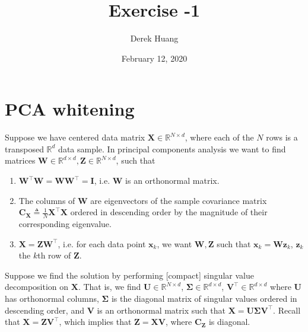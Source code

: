 \documentclass{article}
\title{Exercise -1}
\author{Derek Huang}
\date{February 12, 2020}
\numberwithin{equation}{section}
\begin{document}
\maketitle
\thispagestyle{fancy}

\section{PCA whitening}

Suppose we have centered data matrix $ \mathbf{X} \in
\mathbb{R}^{N \times d} $, where each of the $ N $ rows is a transposed
$ \mathbb{R}^d $ data sample. In principal components analysis we want to find
matrices $ \mathbf{W} \in \mathbb{R}^{d \times d},
\mathbf{Z} \in \mathbb{R}^{N \times d} $, such that
\begin{enumerate}
    \item
    $ \mathbf{W}^\top\mathbf{W} = \mathbf{WW}^\top = \mathbf{I} $, i.e.
    $ \mathbf{W} $ is an orthonormal matrix.

    \item
    The columns of $ \mathbf{W} $ are eigenvectors of the sample covariance
    matrix $ \mathbf{C}_\mathbf{X} \triangleq \frac{1}{N}\mathbf{X}^\top\mathbf{X} $
    ordered in descending order by the magnitude of their corresponding
    eigenvalue.

    \item
    $ \mathbf{X} = \mathbf{ZW}^\top $, i.e. for each data point
    $ \mathbf{x}_k $, we want $ \mathbf{W}, \mathbf{Z} $ such that
    $ \mathbf{x}_k = \mathbf{Wz}_k $, $ \mathbf{z}_k $ the $ k $th row of
    $ \mathbf{Z} $.
\end{enumerate}

Suppose we find the solution by performing [compact] singular value
decomposition on $ \mathbf{X} $. That is, we find $ \mathbf{U} \in
\mathbb{R}^{N \times d} $, $ \mathbf{\Sigma} \in \mathbb{R}^{d \times d} $,
$ \mathbf{V}^\top \in \mathbb{R}^{d \times d} $ where $ \mathbf{U} $ has
orthonormal columns, $ \mathbf{\Sigma} $ is the diagonal matrix of singular
values\footnotemark{} ordered in descending order, and $ \mathbf{V} $ is an orthonormal matrix
such that $ \mathbf{X} = \mathbf{U\Sigma V}^\top $. Recall that
$ \mathbf{X} = \mathbf{ZV}^\top $, which implies that
$ \mathbf{Z} = \mathbf{XV} $, where $ \mathbf{C}_\mathbf{Z} $ is diagonal.
\end{document}
